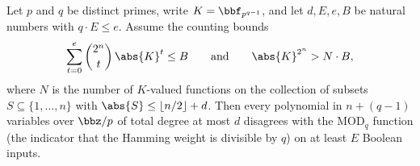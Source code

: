 \begin{theorem}
\label{RazborovSmolensky.smolensky_modQ_lowDegreeBadCountLB}
\leanok
{}
Let $p$ and $q$ be distinct primes, write $K = \bbf_{p^{q-1}}$, and let $d, E, e, B$ be
natural numbers with $q \cdot E \le e$.  Assume the counting bounds
\[
  \sum_{t=0}^{e} \binom{2^n}{t}\,\abs{K}^{t} \le B
  \qquad\text{and}\qquad
  \abs{K}^{2^n} > N \cdot B,
\]
where $N$ is the number of $K$-valued functions on the collection of subsets
$S \subseteq \{1,\dots,n\}$ with $\abs{S} \le \lfloor n/2 \rfloor + d$.  Then every
polynomial in $n + (q-1)$ variables over $\bbz/p$ of total degree at most $d$ disagrees
with the $\mathrm{MOD}_q$ function (the indicator that the Hamming weight is divisible
by $q$) on at least $E$ Boolean inputs.
\end{theorem}

